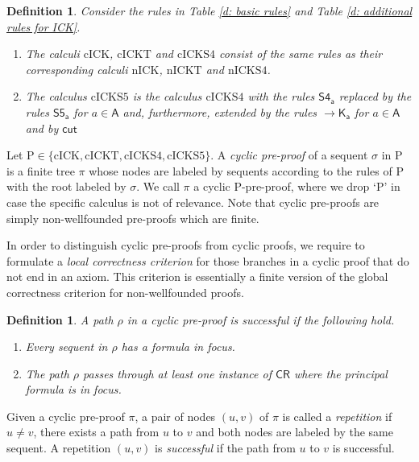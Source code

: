 \documentclass{myifcolog}
\newcommand\C {C}
\newcommand{\K}{K}
\newcommand\A{\mathsf{A}}
\newcommand{\agi}{a}
\newcommand{\hickp}{\mathrm{P}}
\newcommand{\cick}{\mathrm{cICK}}
\newcommand{\cickt}{\mathrm{cICKT}}
\newcommand{\cicks}{\mathrm{cICKS4}}
\newcommand{\cickss}{\mathrm{cICKS5}}
\newcommand{\nick}{\mathrm{nICK}}
\newcommand{\nickt}{\mathrm{nICKT}}
\newcommand{\nicks}{\mathrm{nICKS4}}
\newtheorem{definition}[theorem]{Definition}
\numberwithin{theorem}{section}
\begin{document}
\begin{definition}
    Consider the rules in Table \ref{d: basic rules} and Table \ref{d: additional rules for ICK}.
    \begin{enumerate}
        \item The calculi $\cick$, $\cickt$ and $\cicks$ consist of the same rules as their corresponding calculi $\nick$, $\nickt$ and $\nicks$.
        \item The calculus $\cickss$ is the calculus $\cicks$ with the rules $\mathsf{S4_\agi}$ replaced by the rules  $\mathsf{S5_\agi}$ for $\agi \in \A$ and, furthermore, extended by the rules ${\rightarrow}\mathsf{\K_\agi}$ for $\agi \in \A$ and by $\mathsf{cut}$
    \end{enumerate}
\end{definition}

 Let $\hickp \in \{\cick, \cickt, \cicks, \cickss\}$. A \emph{cyclic pre-proof} of a sequent $\sigma$ in $\hickp$ is a finite tree $\pi$ whose nodes are labeled by sequents according to the rules of $\hickp$ with the root labeled by $\sigma$. We call $\pi$ a cyclic $\hickp$-pre-proof, where we drop `$\hickp$' in case the specific calculus is not of relevance. Note that cyclic pre-proofs are simply non-wellfounded pre-proofs which are finite.


In order to distinguish cyclic pre-proofs from cyclic proofs, we require to formulate a \emph{local correctness criterion} for those branches in a cyclic proof that do not end in an axiom. This criterion is essentially a finite version of the global correctness criterion for non-wellfounded proofs.


\begin{definition}
    A path $\rho$ in a cyclic pre-proof is \emph{successful} if the following hold.
    \begin{enumerate}
        \item Every sequent in $\rho$ has a formula in focus.
        \item The path $\rho$ passes through at least one instance of $\mathsf{\C R}$ where the principal formula is in focus.
    \end{enumerate}
\end{definition}

Given a cyclic pre-proof $\pi$, a pair of nodes $(u,v)$ of $\pi$ is called a \emph{repetition} if $u \not = v$, there exists a path from $u$ to $v$ and both nodes are labeled by the same sequent. A repetition $(u,v)$ is \emph{successful} if the path from $u$ to $v$ is successful.
\end{document}
